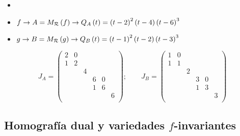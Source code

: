 \begin{example}
    \begin{itemize}
        \item[]
        \item $f \to A= M_{\mathcal{R}} \left( f \right) \to Q_A\left( t \right) = \left( t-2 \right)^2\left( t-4 \right)\left( t-6 \right)^3$
        \item $g \to B= M_{\mathcal{R}} \left( g \right) \to Q_B\left( t \right) = \left( t-1 \right)^2\left( t-2 \right)\left( t-3 \right)^3$
    \end{itemize}
    \[
        J_A = 
        \begin{pmatrix}
            2 & 0 &   &   &   &   \\
            1 & 2 &   &   &   &   \\
              &   & 4 &   &   &   \\
              &   &   & 6 & 0 &   \\
              &   &   & 1 & 6 &   \\
              &   &   &   &   & 6 \\
        \end{pmatrix}; \qquad
        J_B =
        \begin{pmatrix}
            1 & 0 &   &   &   &   \\
            1 & 1 &   &   &   &   \\
              &   & 2 &   &   &   \\
              &   &   & 3 & 0 &   \\
              &   &   & 1 & 3 &   \\
              &   &   &   &   & 3 \\
        \end{pmatrix}
    \]
\end{example}

\subsection{Homografía dual y variedades $f$-invariantes}

